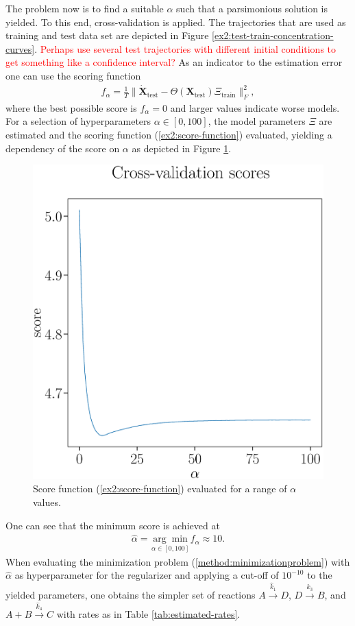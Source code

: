 \documentclass[oneside, abstracton, titlepage]{scrartcl}
\begin{document}
	The problem now is to find a suitable $\alpha$ such that a parsimonious solution is yielded. To this end, cross-validation is applied. The trajectories that are used as training and test data set are depicted in Figure \ref{ex2:test-train-concentration-curves}. \textcolor{red}{Perhaps use several test trajectories with different initial conditions to get something like a confidence interval?} As an indicator to the estimation error one can use the scoring function
	\begin{align}
		f_\alpha = \frac{1}{T}\|\dot{\mathbf{X}}_\text{test} - \Theta (\textbf{X}_\text{test}) \Xi_\text{train}\|_F^2,
		\label{ex2:score-function}
	\end{align}
	where the best possible score is $f_\alpha = 0$ and larger values indicate worse models.
	For a selection of hyperparameters $\alpha\in [0, 100]$, the model parameters $\Xi$ are estimated and the scoring function (\ref{ex2:score-function}) evaluated, yielding a dependency of the score on $\alpha$ as depicted in Figure \ref{ex2:score-graph}.

	\begin{figure}
		\begin{center}
			\includegraphics[width=.5\textwidth]{./figures_tex/cv_score}
		\end{center}
		\caption{Score function (\ref{ex2:score-function}) evaluated for a range of $\alpha$ values.}
		\label{ex2:score-graph}
	\end{figure}

	One can see that the minimum score is achieved at
	\begin{align}
		\hat{\alpha} = \underset{\alpha\in[0,100]}{\arg\min}f_\alpha\approx 10.
	\end{align}
	When evaluating the minimization problem (\ref{method:minimizationproblem}) with $\hat{\alpha}$ as hyperparameter for the regularizer and applying a cut-off of $10^{-10}$ to the yielded parameters, one obtains the simpler set of reactions $A\xrightarrow{\hat{k}_1}D$, $D\xrightarrow{\hat{k}_3} B$, and $A+B\xrightarrow{\hat{k}_4}C$ with rates as in Table \ref{tab:estimated-rates}.
\end{document}
